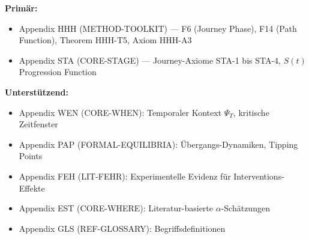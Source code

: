 \begin{tcolorbox}[colback=yellow!10!white, colframe=orange!75!black,
    title=Appendix References for This Chapter]

\textbf{Primär:}
\begin{itemize}[nosep]
\item Appendix HHH (METHOD-TOOLKIT) --- F6 (Journey Phase), F14 (Path Function), Theorem HHH-T5, Axiom HHH-A3
\item Appendix STA (CORE-STAGE) --- Journey-Axiome STA-1 bis STA-4, $S(t)$ Progression Function
\end{itemize}

\textbf{Unterstützend:}
\begin{itemize}[nosep]
\item Appendix WEN (CORE-WHEN): Temporaler Kontext $\Psi_T$, kritische Zeitfenster
\item Appendix PAP (FORMAL-EQUILIBRIA): Übergangs-Dynamiken, Tipping Points
\item Appendix FEH (LIT-FEHR): Experimentelle Evidenz für Interventions-Effekte
\item Appendix EST (CORE-WHERE): Literatur-basierte $\alpha$-Schätzungen
\item Appendix GLS (REF-GLOSSARY): Begriffsdefinitionen
\end{itemize}
\end{tcolorbox}


